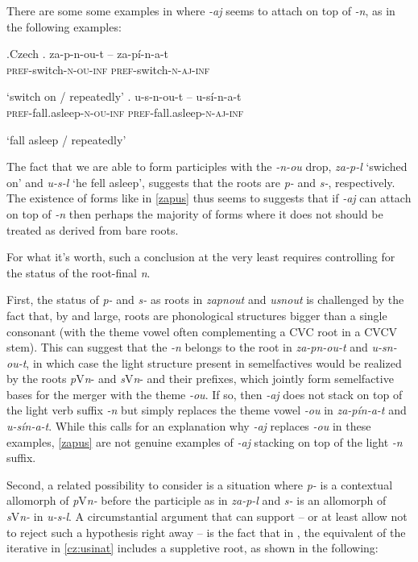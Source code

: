 There are some some examples in  where \textit{-aj} seems to attach on top of \textit{-n}, as in the following examples:

\ex.Czech\label{zapus}
\ag. za-p-n-ou-t -- za-p\'i-n-a-t\\
 \textsc{pref}-switch-\textsc{n-ou-inf} {} \textsc{pref}-switch-\textsc{n-aj-inf}\\
 \strut `switch on / repeatedly'
\bg. u-s-n-ou-t -- u-s\'i-n-a-t\\
\textsc{pref}-fall.asleep-\textsc{n-ou-inf} {} \textsc{pref}-fall.asleep-\textsc{n-aj-inf}\\
\strut `fall asleep / repeatedly'\label{cz:usinat}

The fact that we are able to form participles with the \textit{-n-ou} drop, \textit{za-p-l} `swiched on' and \textit{u-s-l} `he fell asleep', suggests that the roots are \textit{p-} and \textit{s-}, respectively. The existence of forms like in \ref{zapus} thus seems to suggests that if \textit{-aj} can attach on top of \textit{-n} then perhaps the majority of forms where it does not should be treated as derived from bare roots.
\par
For what it's worth, such a conclusion at the very least requires controlling for the status of the root-final \textit{n}.
\par
First, the status of \textit{p-} and \textit{s-} as roots in \textit{zapnout} and \textit{usnout} is challenged by the fact that, by and large,  roots are phonological structures bigger than a single consonant (with the theme vowel  often complementing a CVC root in a CVCV stem). This can suggest that the \textit{-n} belongs to the root in \textit{za-pn-ou-t} and \textit{u-sn-ou-t}, in which case the light  structure present in  semelfactives would be realized by the roots \textit{p}V\textit{n}- and \textit{s}V\textit{n}- and their prefixes, which jointly form semelfactive bases for the merger with the theme \textit{-ou}. If so, then \textit{-aj} does not stack on top of the light verb suffix \textit{-n} but simply replaces the theme vowel \textit{-ou} in \textit{za-p\'in-a-t} and \textit{u-s\'in-a-t}. While this calls for an explanation why \textit{-aj} replaces \textit{-ou} in these examples, \ref{zapus} are not genuine examples of \textit{-aj} stacking on top of the light \textit{-n} suffix. 
\par
Second, a related possibility to consider is a situation where \textit{p-} is a contextual allomorph  of \textit{p}V\textit{n-} before the participle as in \textit{za-p-l} and \textit{s-} is an allomorph of \textit{s}V\textit{n-} in \textit{u-s-l}. A circumstantial argument that can support -- or at least allow not to reject such a hypothesis right away -- is the fact that in , the equivalent of the  iterative in \ref{cz:usinat} includes a suppletive root, as shown in the following:

